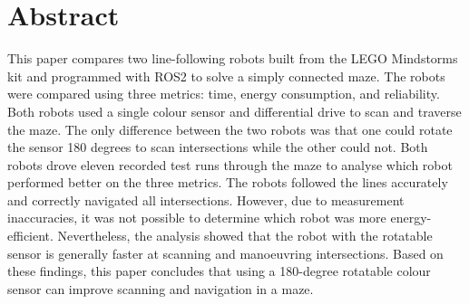 \section*{Abstract}

This paper compares two line-following robots built from the LEGO Mindstorms kit and programmed with ROS2 to solve a simply connected maze. The robots were compared using three metrics: time, energy consumption, and reliability. Both robots used a single colour sensor and differential drive to scan and traverse the maze. The only difference between the two robots was that one could rotate the sensor 180 degrees to scan intersections while the other could not. Both robots drove eleven recorded test runs through the maze to analyse which robot performed better on the three metrics. The robots followed the lines accurately and correctly navigated all intersections. However, due to measurement inaccuracies, it was not possible to determine which robot was more energy-efficient. Nevertheless, the analysis showed that the robot with the rotatable sensor is generally faster at scanning and manoeuvring intersections. Based on these findings, this paper concludes that using a 180-degree rotatable colour sensor can improve scanning and navigation in a maze.